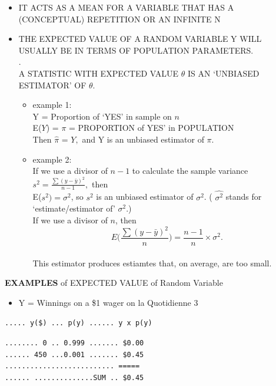\documentclass[]{book}
\providecommand{\tightlist}{%
  \setlength{\itemsep}{0pt}\setlength{\parskip}{0pt}}
\begin{document}
\begin{itemize}
\item
  IT ACTS AS A MEAN FOR A VARIABLE THAT HAS A (CONCEPTUAL) REPETITION OR AN INFINITE N
\item
  THE EXPECTED VALUE OF A RANDOM VARIABLE Y WILL USUALLY BE IN TERMS OF POPULATION PARAMETERS.\\
  .\\
  A STATISTIC WITH EXPECTED VALUE \(\theta\) IS AN `UNBIASED ESTIMATOR' OF \(\theta\).

  \begin{itemize}
  \item
    example 1:\\
    Y = Proportion of `YES' in sample on \(n\)\\
    E(\(Y\)) = \(\pi\) = PROPORTION of YES' in POPULATION\\
    Then \(\hat{\pi}\) = \(Y,\) and Y is an unbiased estimator of \(\pi.\)
  \item
    example 2:\\
    If we use a divisor of \(n - 1\) to calculate the sample variance \(s^2 = \frac{\sum(y-\bar{y})^2}{n-1},\) then\\
    E(\(s^2) = \sigma^2\), so
    \(s^2\) is an unbiased estimator of \(\sigma^2\). ( \(\widehat{\sigma^2}\) stands for `estimate/estimator of' \(\sigma^2.\))\\
    If we use a divisor of \(n\), then\\
    \[E\bigg(\frac{\sum(y-\bar{y})^2}{n}\bigg) = \frac{n-1}{n} \times \sigma^2.\]\\
    This estimator produces estiamtes that, on average, are too small.
  \end{itemize}
\end{itemize}

\textbf{EXAMPLES} of EXPECTED VALUE of Random Variable

\begin{itemize}
\tightlist
\item
  Y = Winnings on a \$1 wager on la Quotidienne 3
\end{itemize}

\texttt{.....\ y(\$)\ ...\ p(y)\ ......\ y\ x\ p(y)}

\texttt{........\ 0\ ..\ 0.999\ .......\ \$0.00}\\
\texttt{......\ 450\ ...0.001\ .......\ \$0.45}~\\
\texttt{..........................\ =====}~\\
\texttt{......\ ..............SUM\ ..\ \$0.45}
\end{document}
